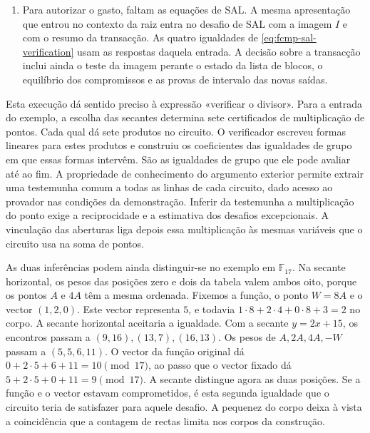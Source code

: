 \begin{enumerate}
\item Para autorizar o gasto, faltam as equações de SAL.
A mesma apresentação que entrou no contexto da raiz entra no
desafio de SAL com a imagem \(I\) e com o resumo da transacção.
As quatro igualdades de \eqref{eq:fcmp-sal-verification} usam
as respostas daquela entrada. A decisão sobre a transacção
inclui ainda o teste da imagem perante o estado da lista de
blocos, o equilíbrio dos compromissos e as provas de intervalo
das novas saídas.
\end{enumerate}

Esta execução dá sentido preciso à expressão «verificar o divisor».
Para a entrada do exemplo, a escolha das secantes determina sete
certificados de multiplicação de pontos. Cada qual dá sete produtos
no circuito. O verificador escreveu formas lineares para estes
produtos e construiu os coeficientes das igualdades de grupo em que
essas formas intervêm. São as igualdades de grupo que ele pode
avaliar até ao fim. A propriedade de conhecimento do argumento exterior
permite extrair uma testemunha comum a todas as linhas de cada circuito,
dado acesso ao provador nas condições da demonstração. Inferir da testemunha a multiplicação do
ponto exige a reciprocidade e a estimativa dos desafios excepcionais.
A vinculação das aberturas liga depois essa multiplicação às mesmas
variáveis que o circuito usa na soma de pontos.

As duas inferências podem ainda distinguir-se no exemplo em
\(\mathbb F_{17}\). Na secante horizontal, os pesos das posições
zero e dois da tabela valem ambos oito, porque os pontos \(A\) e
\(4A\) têm a mesma ordenada. Fixemos a função, o ponto \(W=8A\)
e o vector \((1,2,0)\). Este vector representa \(5\), e todavia
\(1\cdot8+2\cdot4+0\cdot8+3=2\) no corpo. A secante horizontal
aceitaria a igualdade. Com a secante \(y=2x+15\), os encontros
passam a \((9,16),(13,7),(16,13)\). Os pesos de
\(A,2A,4A,-W\) passam a \((5,5,6,11)\). O vector da função
original dá \(0+2\cdot5+6+11=10\pmod {17}\), ao passo que o
vector fixado dá \(5+2\cdot5+0+11=9\pmod {17}\).
A secante distingue agora as duas posições. Se a função e o vector
estavam comprometidos, é esta segunda igualdade que o circuito
teria de satisfazer para aquele desafio. A pequenez do corpo deixa
à vista a coincidência que a contagem de rectas limita nos corpos
da construção.

